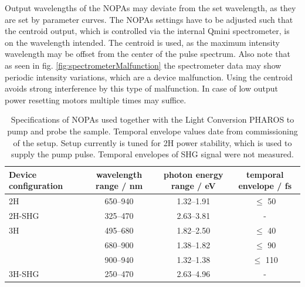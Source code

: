 \documentclass[twoside,openright,listof=numbered]{scrreprt}
\begin{document}
Output wavelengths of the NOPAs may deviate from the set wavelength, as they are set by parameter curves. The NOPAs settings have to be adjusted such that the centroid output, which is controlled via the internal Qmini spectrometer, is on the wavelength intended. The centroid is used, as the maximum intensity wavelength may be offset from the center of the pulse spectrum. Also note that as seen in fig. \ref{fig:spectrometerMalfunction} the spectrometer data may show periodic intensity variations, which are a device malfunction. Using the centroid avoids strong interference by this type of malfunction. In case of low output power resetting motors multiple times may suffice.

\begin{table}
\caption[Specifications of NOPAs used together with the Light Conversion PHAROS to pump and probe the sample.]{Specifications of NOPAs used together with the Light Conversion PHAROS to pump and probe the sample. Temporal envelope values date from commissioning of the setup. Setup currently is tuned for 2H power stability, which is used to supply the pump pulse. Temporal envelopes of SHG signal were not measured.\label{tab:NOPAs}}
\begin{tabular}{lccc}\toprule
Device configuration & wavelength range / nm & photon energy range / eV & temporal envelope / fs \\ \midrule
2H & \SIrange{650}{940}{} & \SIrange{1.32}{1.91}{} & $\leq$ 50 \\ 
2H-SHG & \SIrange{325}{470}{} & \SIrange{2.63}{3.81}{} & - \\\midrule
3H & \SIrange{495}{680}{} & \SIrange{1.82}{2.50}{} & $\leq$ 40 \\
& \SIrange{680}{900}{} & \SIrange{1.38}{1.82}{} & $\leq$ 90 \\
& \SIrange{900}{940}{} & \SIrange{1.32}{1.38}{} & $\leq$ 110 \\
3H-SHG& \SIrange{250}{470}{} & \SIrange{2.63}{4.96}{} & - \\ \bottomrule
\end{tabular}
\end{table}
\end{document}
